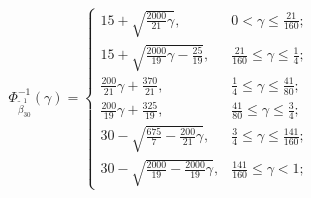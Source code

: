 \[\Phi_{\tilde{\beta}_{30}^1}^{-1}(\gamma)=\left\{
\begin{array}{ll}
15+\sqrt{\frac{2000}{21}\gamma}, & 0<\gamma\leq \frac{21}{160};\\
15+\sqrt{\frac{2000}{19}\gamma-\frac{25}{19}}, & \frac{21}{160}\leq\gamma\leq \frac{1}{4};\\
\frac{200}{21}\gamma+\frac{370}{21}, &\frac{1}{4}\leq \gamma\leq \frac{41}{80};\\
\frac{200}{19}\gamma+\frac{325}{19}, &\frac{41}{80}\leq \gamma\leq \frac{3}{4};\\
30-\sqrt{\frac{675}{7}-\frac{200}{21}\gamma}, & \frac{3}{4}\leq\gamma\leq \frac{141}{160};\\
30-\sqrt{\frac{2000}{19}-\frac{2000}{19}\gamma}, & \frac{141}{160}\leq\gamma<1;
\end{array}
\right.
\]

